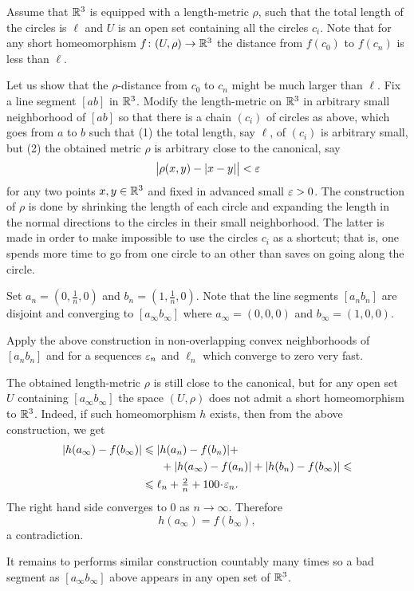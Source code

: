 Assume that $\mathbb{R}^3$ is equipped with a length-metric $\rho$,
such that the total length of the circles is $\ell$
and $U$ is an open set containing all the circles $c_i$.
Note that for any short homeomorphism $f\colon(U,\rho)\to\mathbb{R}^3$ the distance from $f(c_0)$ to $f(c_n)$ is less than $\ell$.

Let us show that the $\rho$-distance from $c_0$ to $c_n$ might be much larger than $\ell$.
Fix a line segment $[ab]$ in $\mathbb{R}^3$.
Modify 
the length-metric on $\mathbb{R}^3$ in arbitrary small neighborhood of $[ab]$
so that there is a chain $(c_i)$ of circles as above,
which goes from $a$ to $b$ 
such that
(1) the total length, say $\ell$, 
of $(c_i)$ is arbitrary small,
but 
(2) the obtained metric $\rho$ 
is arbitrary close to the canonical, say
\[\bigl|\rho(x,y)-|x-y|\bigr|<\varepsilon\]
for any two points $x,y\in\mathbb{R}^3$
and fixed in advanced small $\varepsilon>0$.
The construction of $\rho$ 
is done by shrinking the length of each circle
and expanding the length in the normal directions  
to the circles in their small neighborhood.
The latter is made in order to make impossible to use the circles $c_i$ as a shortcut;
that is, one spends more time to go from one circle to an other 
than saves on going along the circle.

Set $a_n=(0,\tfrac1n,0)$ and $b_n=(1,\tfrac1n,0)$.
Note that the line segments $[a_nb_n]$ are disjoint and converging
to $[a_\infty b_\infty]$
where $a_\infty=(0,0,0)$ and $b_\infty=(1,0,0)$.

Apply the above construction in non-overlapping convex neighborhoods of $[a_nb_n]$ 
and for a sequences 
$\varepsilon_n$ and $\ell_n$ 
which converge to zero very fast.

The obtained length-metric $\rho$ is still close to the canonical,
but for any open set $U$ containing $[a_\infty b_\infty]$
the space $(U,\rho)$ does not admit 
a short homeomorphism to $\mathbb{R}^3$.
Indeed, 
if such homeomorphism $h$ exists, 
then 
from the above construction,
we get 
\begin{align*}
|h(a_\infty)-f(b_\infty)|
&\le 
|h(a_n)-f(b_n)|
+
\\
&\ \ \ \ \ +
|h(a_\infty)-f(a_n)|
+
|h(b_n)-f(b_\infty)|
\le
\\
&\le
\ell_n+\tfrac2n+100\cdot\eps_n.
\end{align*}
The right hand side converges to $0$ as $n\to\infty$.
Therefore 
\[h(a_\infty)=f(b_\infty),\] 
a contradiction.

It remains to performs similar construction countably many times so a bad segment as $[a_\infty b_\infty]$ above
appears in any open set of $\mathbb{R}^3$.\qeds



